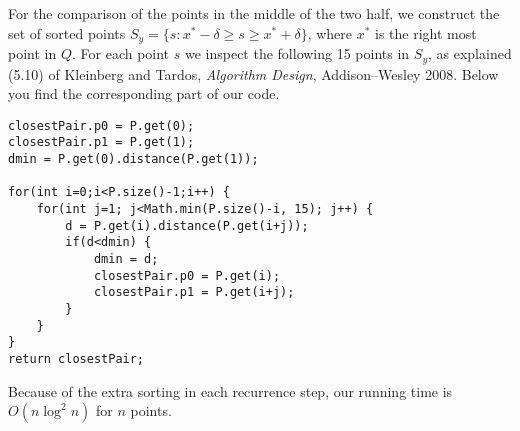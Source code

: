 \documentclass{tufte-handout}
\begin{document}
For the comparison of the points in the middle of the two half, we construct the set of sorted points $S_y= \{s: x^*-\delta \ge s \ge x^*+\delta\}$, where $x^*$ is the right most point in $Q$. For each point $s$ we inspect the following 15 points in $S_y$, as explained (5.10) of Kleinberg and Tardos, \emph{Algorithm Design}, Addison--Wesley 2008. Below you find the corresponding part of our code. 
\begin{verbatim}
closestPair.p0 = P.get(0);
closestPair.p1 = P.get(1);
dmin = P.get(0).distance(P.get(1));

for(int i=0;i<P.size()-1;i++) {
    for(int j=1; j<Math.min(P.size()-i, 15); j++) {
        d = P.get(i).distance(P.get(i+j));
        if(d<dmin) {
            dmin = d;
            closestPair.p0 = P.get(i);
            closestPair.p1 = P.get(i+j);
        }
    }
}
return closestPair;
  \end{verbatim}
Because of the extra sorting in each recurrence step, our running time is $O(n\log^{2} n)$ for $n$ points.
\end{document}
